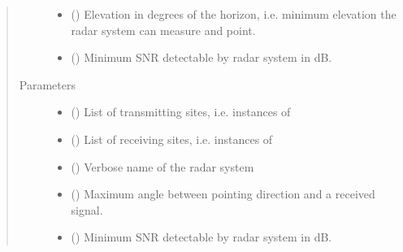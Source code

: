 \documentclass[letterpaper,10pt,english]{sphinxmanual}
\begin{document}
\begin{fulllineitems}
\begin{quote}
\begin{description}
\begin{itemize}
\item {} 
 () \textendash{} Elevation in degrees of the horizon, i.e. minimum elevation the radar system can measure and point.

\item {} 
 () \textendash{} Minimum SNR detectable by radar system in dB.

\end{itemize}

\item[{Parameters}] \leavevmode\begin{itemize}
\item {} 
 () \textendash{} List of transmitting sites, i.e. instances of {\hyperref[\detokenize{modules/antenna:antenna.AntennaTX}]{}}

\item {} 
 () \textendash{} List of receiving sites, i.e. instances of {\hyperref[\detokenize{modules/antenna:antenna.AntennaRX}]{}}

\item {} 
 () \textendash{} Verbose name of the radar system

\item {} 
 () \textendash{} Maximum angle between pointing direction and a received signal.

\item {} 
 () \textendash{} Minimum SNR detectable by radar system in dB.

\end{itemize}

\end{description}\end{quote}


\end{fulllineitems}
\end{document}
